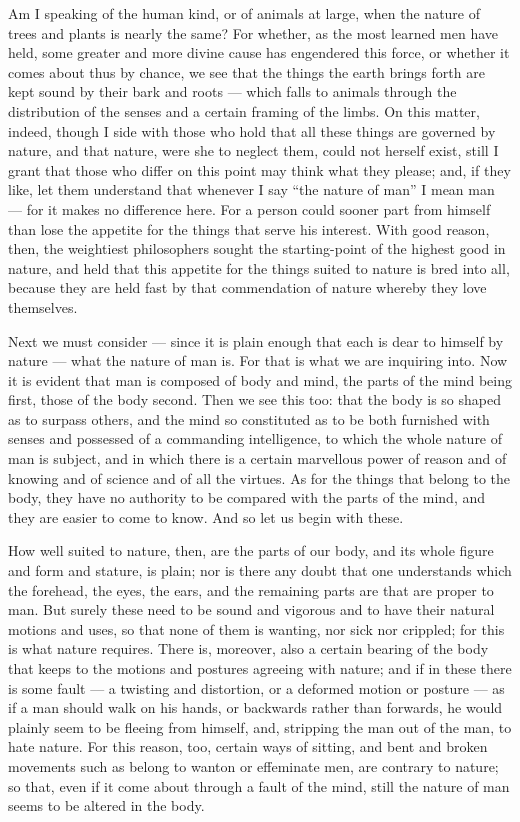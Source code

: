  Am I speaking of the human kind, or of animals at large, when the nature of trees and plants is nearly the same? For whether, as the most learned men have held, some greater and more divine cause has engendered this force, or whether it comes about thus by chance, we see that the things the earth brings forth are kept sound by their bark and roots — which falls to animals through the distribution of the senses and a certain framing of the limbs. On this matter, indeed, though I side with those who hold that all these things are governed by nature, and that nature, were she to neglect them, could not herself exist, still I grant that those who differ on this point may think what they please; and, if they like, let them understand that whenever I say ``the nature of man'' I mean man — for it makes no difference here. For a person could sooner part from himself than lose the appetite for the things that serve his interest. With good reason, then, the weightiest philosophers sought the starting-point of the highest good in nature, and held that this appetite for the things suited to nature is bred into all, because they are held fast by that commendation of nature whereby they love themselves.

 Next we must consider — since it is plain enough that each is dear to himself by nature — what the nature of man is. For that is what we are inquiring into. Now it is evident that man is composed of body and mind, the parts of the mind being first, those of the body second. Then we see this too: that the body is so shaped as to surpass others, and the mind so constituted as to be both furnished with senses and possessed of a commanding intelligence, to which the whole nature of man is subject, and in which there is a certain marvellous power of reason and of knowing and of science and of all the virtues. As for the things that belong to the body, they have no authority to be compared with the parts of the mind, and they are easier to come to know. And so let us begin with these.

 How well suited to nature, then, are the parts of our body, and its whole figure and form and stature, is plain; nor is there any doubt that one understands which the forehead, the eyes, the ears, and the remaining parts are that are proper to man. But surely these need to be sound and vigorous and to have their natural motions and uses, so that none of them is wanting, nor sick nor crippled; for this is what nature requires. There is, moreover, also a certain bearing of the body that keeps to the motions and postures agreeing with nature; and if in these there is some fault — a twisting and distortion, or a deformed motion or posture — as if a man should walk on his hands, or backwards rather than forwards, he would plainly seem to be fleeing from himself, and, stripping the man out of the man, to hate nature. For this reason, too, certain ways of sitting, and bent and broken movements such as belong to wanton or effeminate men, are contrary to nature; so that, even if it come about through a fault of the mind, still the nature of man seems to be altered in the body.

